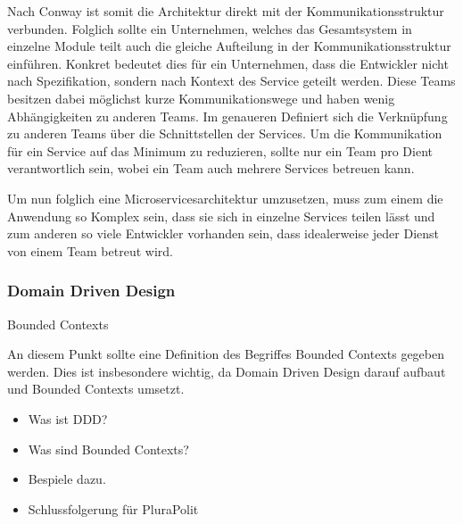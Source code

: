 Nach Conway ist somit die Architektur direkt mit der Kommunikationsstruktur verbunden. Folglich sollte ein Unternehmen, welches das Gesamtsystem in einzelne Module teilt auch die gleiche Aufteilung in der Kommunikationsstruktur einführen. Konkret bedeutet dies für ein Unternehmen, dass die Entwickler nicht nach Spezifikation, sondern nach Kontext des Service geteilt werden. Diese Teams besitzen dabei möglichst kurze Kommunikationswege und haben wenig Abhängigkeiten zu anderen Teams. Im genaueren Definiert sich die Verknüpfung zu anderen Teams über die Schnittstellen der Services.
Um die Kommunikation für ein Service auf das Minimum zu reduzieren, sollte nur ein Team pro Dient verantwortlich sein, wobei ein Team auch mehrere Services betreuen kann. 

Um nun folglich eine Microservicesarchitektur umzusetzen, muss zum einem die Anwendung so Komplex sein, dass sie sich in einzelne Services teilen lässt und zum anderen so viele Entwickler vorhanden sein, dass idealerweise jeder Dienst von einem Team betreut wird.

\subsubsection{Domain Driven Design}

Bounded Contexts

An diesem Punkt sollte eine Definition des Begriffes Bounded Contexts gegeben werden. Dies ist insbesondere wichtig, da Domain Driven Design darauf aufbaut und Bounded Contexts umsetzt.


\begin{itemize}
	\item Was ist DDD?
	\item Was sind Bounded Contexts?
	\item 	Bespiele dazu.
	\item Schlussfolgerung für PluraPolit
\end{itemize}
